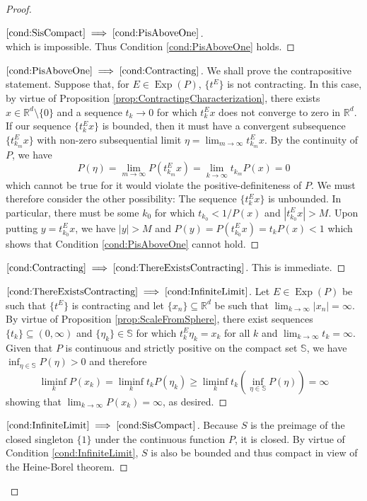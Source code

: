 \documentclass[11pt]{article}
\newcommand*{\myproofname}{Proof}
\newenvironment{subproof}[1][\myproofname]{\begin{proof}[#1]\renewcommand*{\qedsymbol}{$\mathbin{/\mkern-6mu/}$}}{\end{proof}}
\newcommand\Exp{\operatorname{Exp}}
\begin{document}
\begin{proof}
\begin{subproof}[$\ref{cond:SisCompact}\implies\ref{cond:PisAboveOne}$]
\begin{equation*}
\end{equation*}
which is impossible. Thus Condition \ref{cond:PisAboveOne} holds.
\end{subproof}
\begin{subproof}[$\ref{cond:PisAboveOne}\implies\ref{cond:Contracting}$]
We shall prove the contrapositive statement. Suppose that, for $E\in\Exp(P)$, $\{t^E\}$ is not contracting. In this case, by virtue of Proposition \ref{prop:ContractingCharacterization}, there exists $x\in\mathbb{R}^d\setminus\{0\}$ and a sequence $t_k\to 0$ for which $t_k^Ex$ does not converge to zero in $\mathbb{R}^d$. If our sequence $\{t_k^Ex\}$ is bounded, then it must have a convergent subsequence $\{t_{k_m}^Ex\}$ with non-zero subsequential limit $\eta=\lim_{m\to\infty}t_{k_m}^Ex$. By the continuity of $P$, we have
\begin{equation*}
P(\eta)=\lim_{m\to\infty}P(t_{k_m}^Ex)=\lim_{k\to\infty}t_{k_m}P(x)=0
\end{equation*}
which cannot be true for it would violate the positive-definiteness of $P$. We must therefore consider the other possibility: The sequence $\{t_k^Ex\}$ is unbounded. In particular, there must be some $k_0$ for which $t_{k_0}<1/P(x)$ and $|t_{k_0}^Ex|>M$. Upon putting $y=t_{k_0}^Ex$, we have $|y|>M$ and  $P(y)=P(t_{k_0}^Ex)=t_kP(x)<1$ which shows that Condition \ref{cond:PisAboveOne} cannot hold.
\end{subproof}
\begin{subproof}[$\ref{cond:Contracting}\implies\ref{cond:ThereExistsContracting}$] This is immediate.
\end{subproof}
\begin{subproof}[$\ref{cond:ThereExistsContracting}\implies\ref{cond:InfiniteLimit}$]
Let $E\in\Exp(P)$ be such that $\{t^E\}$ is contracting and let $\{x_n\}\subseteq\mathbb{R}^d$ be such that $\lim_{k\to\infty}|x_n|=\infty$. By virtue of Proposition \ref{prop:ScaleFromSphere}, there exist sequences $\{t_k\}\subseteq (0,\infty)$ and $\{\eta_k\}\in\mathbb{S}$ for which $t_k^E\eta_k=x_k$ for all $k$ and $\lim_{k\to\infty}t_k=\infty$. Given that $P$ is continuous and strictly positive on the compact set $\mathbb{S}$, we have $\inf_{\eta\in\mathbb{S}}P(\eta)>0$ and therefore
\begin{equation*}
\liminf_k P(x_k)=\liminf_k t_kP(\eta_k)\geq \liminf_k t_k\left(\inf_{\eta\in\mathbb{S}}P(\eta)\right)=\infty
\end{equation*}
showing that $\lim_{k\to\infty} P(x_k)=\infty$, as desired.
\end{subproof}
\begin{subproof}[$\ref{cond:InfiniteLimit}\implies\ref{cond:SisCompact}$]
Because $S$ is the preimage of the closed singleton $\{1\}$ under the continuous function $P$, it is closed. By virtue of Condition \ref{cond:InfiniteLimit}, $S$ is also be bounded and thus compact in view of the Heine-Borel theorem.
\end{subproof}
\end{proof}
\end{document}
